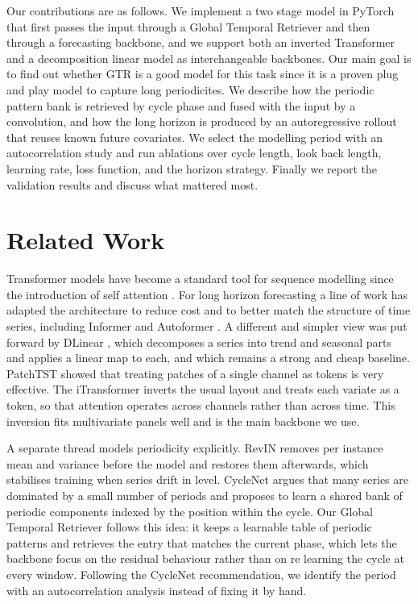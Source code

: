 \documentclass[11pt]{article}
\begin{document}
Our contributions are as follows. We implement a two stage model in PyTorch that first passes
the input through a Global Temporal Retriever \cite{cao2026gtr} and then through a forecasting backbone, and we
support both an inverted Transformer and a decomposition linear model as interchangeable
backbones. Our main goal is to find out whether GTR \cite{cao2026gtr} is a good model for this task since it is 
a proven plug and play model to capture long periodicites. We describe how the periodic pattern bank is retrieved by cycle phase and fused with
the input by a convolution, and how the long horizon is produced by an autoregressive rollout
that reuses known future covariates. We select the modelling period with an autocorrelation
study and run ablations over cycle length, look back length, learning rate, loss function, and
the horizon strategy. Finally we report the validation results and discuss what mattered most.

\section{Related Work}
Transformer models have become a standard tool for sequence modelling since the introduction of
self attention \cite{vaswani2017}. For long horizon forecasting a line of work has adapted the
architecture to reduce cost and to better match the structure of time series, including
Informer \cite{zhou2021informer} and Autoformer \cite{wu2021autoformer}. A different and
simpler view was put forward by DLinear \cite{zeng2023dlinear}, which decomposes a series into
trend and seasonal parts and applies a linear map to each, and which remains a strong and
cheap baseline. PatchTST \cite{nie2023patchtst} showed that treating patches of a single channel
as tokens is very effective. The iTransformer \cite{liu2024itransformer} inverts the usual
layout and treats each variate as a token, so that attention operates across channels rather
than across time. This inversion fits multivariate panels well and is the main backbone we use.

A separate thread models periodicity explicitly. RevIN \cite{kim2022revin} removes per instance
mean and variance before the model and restores them afterwards, which stabilises training when
series drift in level. CycleNet \cite{lin2024cyclenet} argues that many series are dominated by
a small number of periods and proposes to learn a shared bank of periodic components indexed by
the position within the cycle. Our Global Temporal Retriever \cite{cao2026gtr} follows this idea: it keeps a
learnable table of periodic patterns and retrieves the entry that matches the current phase,
which lets the backbone focus on the residual behaviour rather than on re learning the cycle at
every window. Following the CycleNet recommendation, we identify the period with an
autocorrelation analysis instead of fixing it by hand.
\end{document}

